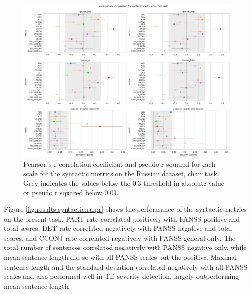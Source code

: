 \begin{figure}[ht!]
    \includegraphics[width=1.1\textwidth, center]{Figures/chapter_4/syntactic/ru_chair_scale_r.png} 
\captionsetup{width=\textwidth}
\caption[Syntactic Metrics: Russian, Chair Task]{\label{fig:results:syntactic:ru:ch} Pearson's r correlation coefficient and pseudo r squared for each scale for the syntactic metrics on the Russian dataset, chair task. Grey indicates the values below the 0.3 threshold in absolute value or pseudo r squared below 0.09.}
\end{figure}

\clearpage
Figure \ref{fig:results:syntactic:ru:pr} shows the performance of the syntactic metrics on the present task. PART rate correlated positively with PANSS positive and total scores, DET rate correlated negatively with PANSS negative and total scores, and CCONJ rate correlated negatively with PANSS general only. The total number of sentences correlated negatively with PANSS negative only, while mean sentence length did so with all PANSS scales but the positive. Maximal sentence length and the standard deviation correlated negatively with all PANSS scales and also performed well in TD severity detection, largely outperforming mean sentence length.


